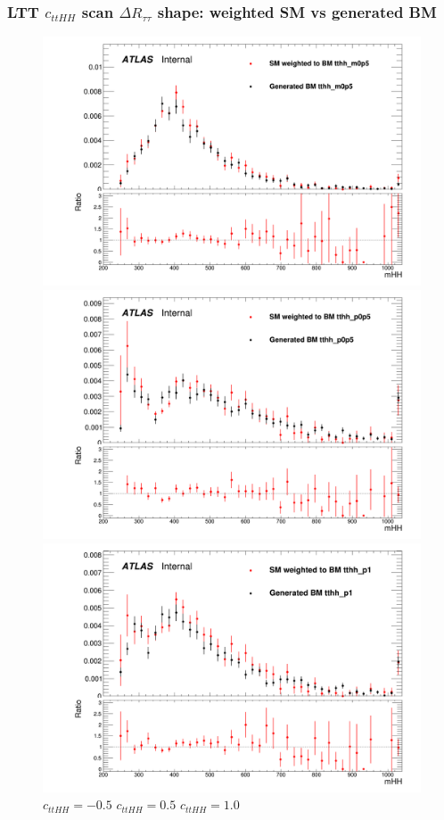 \documentclass[twoside,11pt]{beamer}
\begin{document}
\begin{frame}
\frametitle{LTT $c_{ttHH}$ scan $\Delta R_{\tau\tau}$ shape: weighted SM vs generated BM}
\begin{figure}
\includegraphics[width=.32\textwidth]{figures/Method_B_all_latest_LTT/BMtthh_m0p5h_mHH.png}
\includegraphics[width=.32\textwidth]{figures/Method_B_all_latest_LTT/BMtthh_p0p5h_mHH.png}
\includegraphics[width=.32\textwidth]{figures/Method_B_all_latest_LTT/BMtthh_p1h_mHH.png}
$c_{ttHH} = -0.5$ \hspace{5em} $c_{ttHH} = 0.5$\hspace{5em} $c_{ttHH} = 1.0$    
\end{figure}

\end{frame}   
\end{document}
